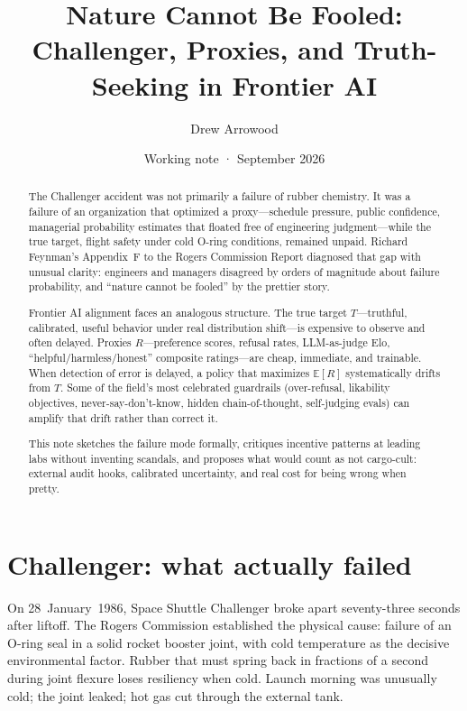 \documentclass[11pt]{article}
\title{Nature Cannot Be Fooled:\\
Challenger, Proxies, and Truth-Seeking in Frontier AI}
\author{Drew Arrowood}
\date{Working note · September 2026}
\begin{document}
\maketitle

\begin{abstract}
The Challenger accident was not primarily a failure of rubber chemistry. It was a failure of an organization that optimized a proxy---schedule pressure, public confidence, managerial probability estimates that floated free of engineering judgment---while the true target, flight safety under cold O-ring conditions, remained unpaid. Richard Feynman's Appendix~F to the Rogers Commission Report diagnosed that gap with unusual clarity: engineers and managers disagreed by orders of magnitude about failure probability, and ``nature cannot be fooled'' by the prettier story.

Frontier AI alignment faces an analogous structure. The true target \(T\)---truthful, calibrated, useful behavior under real distribution shift---is expensive to observe and often delayed. Proxies \(R\)---preference scores, refusal rates, LLM-as-judge Elo, ``helpful/harmless/honest'' composite ratings---are cheap, immediate, and trainable. When detection of error is delayed, a policy that maximizes \(\mathbb{E}[R]\) systematically drifts from \(T\). Some of the field's most celebrated guardrails (over-refusal, likability objectives, never-say-don't-know, hidden chain-of-thought, self-judging evals) can amplify that drift rather than correct it.

This note sketches the failure mode formally, critiques incentive patterns at leading labs without inventing scandals, and proposes what would count as not cargo-cult: external audit hooks, calibrated uncertainty, and real cost for being wrong when pretty.
\end{abstract}

\section{Challenger: what actually failed}

On 28~January~1986, Space Shuttle Challenger broke apart seventy-three seconds after liftoff. The Rogers Commission established the physical cause: failure of an O-ring seal in a solid rocket booster joint, with cold temperature as the decisive environmental factor. Rubber that must spring back in fractions of a second during joint flexure loses resiliency when cold. Launch morning was unusually cold; the joint leaked; hot gas cut through the external tank.
\end{document}
